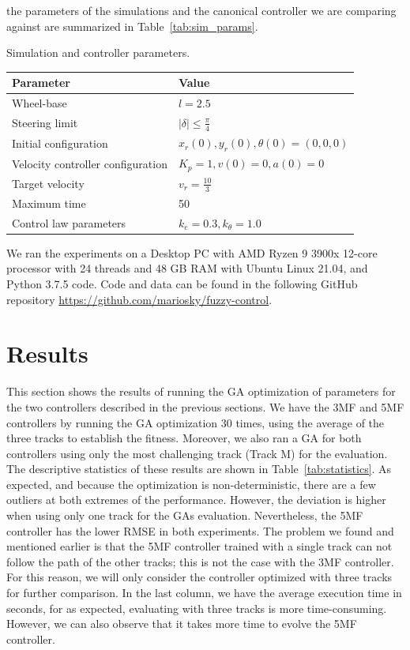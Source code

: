 \documentclass[symmetry,article,submit,moreauthors,pdftex]{Definitions/mdpi}
\begin{document}
the parameters of the simulations and the canonical controller we are comparing
against are summarized in Table~\ref{tab:sim_params}.

\begin{specialtable}[H] 
\small
\caption{Simulation and controller parameters.}\label{tab:sim_params}
\begin{tabular}{ll}
\toprule
\textbf{Parameter}	& \textbf{Value}\\
\midrule
Wheel-base & $l=2.5$		\\
Steering limit & $|\delta|\le \frac{\pi}{4}$	\\
Initial configuration & $x_r(0),y_r(0),\theta(0)= (0,0,0)$\\
Velocity controller configuration & $K_p=1, v(0)=0, a(0)=0$\\
Target velocity & $v_r=\frac{10}{3}$\\
Maximum time & 50 \\ 
Control law parameters&$k_e=0.3, k_{\theta}=1.0$\\ 
\bottomrule
\end{tabular}
\end{specialtable}

We ran the experiments on a Desktop PC with AMD Ryzen 9 3900x 12-core processor
with 24 threads and 48 GB RAM with Ubuntu Linux 21.04, and Python 3.7.5 code.
Code and data can be found in the following GitHub repository
\url{https://github.com/mariosky/fuzzy-control}.




\section{Results}\label{Results}

This section shows the results of running the GA optimization of parameters for
the two controllers described in the previous sections. We have the 3MF and 5MF
controllers by running the GA optimization 30 times, using the average of the
three tracks to establish the fitness.  Moreover, we also ran a GA for both
controllers using only the most challenging track (Track M) for the evaluation.
The descriptive statistics of these results are shown in
Table~\ref{tab:statistics}.  As expected, and because the optimization is
non-deterministic, there are a few outliers at both extremes of the
performance. However, the deviation is higher when using only one track for the
GAs evaluation. Nevertheless, the 5MF controller has the lower RMSE in both
experiments.  The problem we found and mentioned earlier is that the 5MF
controller trained with a single track can not follow the path of the other
tracks; this is not the case with the 3MF controller.  For this reason, we will
only consider the controller optimized with three tracks for further
comparison. In the last column, we have the average execution time in seconds,
for as expected, evaluating with three tracks is more time-consuming. However,
we can also observe that it takes more time to evolve the 5MF controller. 
\end{document}
